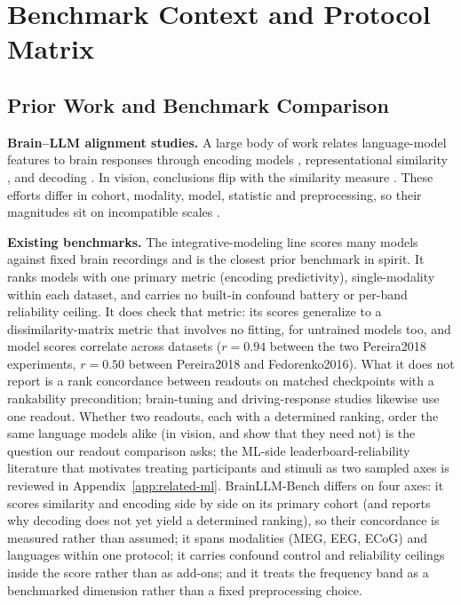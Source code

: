 \documentclass{article}
\begin{document}
\section{Benchmark Context and Protocol Matrix}
\subsection{Prior Work and Benchmark Comparison}\label{app:related-benchmarks}

\textbf{Brain--LLM alignment studies.} A large body of work relates
language-model features to brain responses through encoding models
\citep{schrimpf2021neural, caucheteux2023evidence, antonello2024scaling, toneva2019interpreting,
goldstein2022shared}, representational similarity \citep{kriegeskorte2008representational,
nili2014toolbox}, and decoding \citep{tang2023semantic, defossez2023decoding}. In vision,
conclusions flip with the similarity measure \citep{soni2024conclusions, ahlert2024aligned}. These efforts differ in cohort, modality, model, statistic and
preprocessing, so their magnitudes sit on incompatible scales \citep{oota2024survey}.

\textbf{Existing benchmarks.} The integrative-modeling line \citep{schrimpf2021neural}
scores many models against fixed brain recordings and is the closest prior benchmark in
spirit. It ranks models with one primary metric (encoding predictivity), single-modality within
each dataset, and carries no built-in confound battery or per-band reliability ceiling. It does
check that metric: its scores generalize to a dissimilarity-matrix metric that involves no fitting,
for untrained models too, and model scores correlate across datasets ($r = 0.94$ between the two
Pereira2018 experiments, $r = 0.50$ between Pereira2018 and Fedorenko2016).
What it does not report is a rank concordance between readouts on matched checkpoints with a
rankability precondition; brain-tuning and
driving-response studies \citep{moussa2025braintuning, tuckute2024driving} likewise use one
readout. Whether two readouts, each with a determined ranking, order the same language models alike
(in vision, \citet{soni2024conclusions} and
\citet{ahlert2024aligned} show that they need not) is the question our readout comparison asks; the ML-side leaderboard-reliability
literature that motivates treating participants and stimuli as two sampled axes is reviewed in
Appendix~\ref{app:related-ml}. BrainLLM-Bench differs on four axes: it scores similarity and encoding side by side on its
primary cohort (and reports why decoding does not yet yield a determined ranking), so their
concordance is measured rather than assumed; it spans modalities (MEG, EEG, ECoG)
and languages within one protocol; it carries confound control and reliability ceilings
inside the score rather than as add-ons; and it treats the frequency band as a benchmarked
dimension rather than a fixed preprocessing choice.
\end{document}
